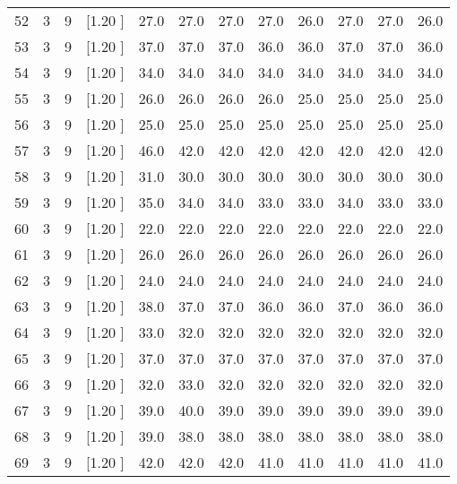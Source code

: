 \documentclass[12pt,a4paper]{article}
\begin{document}
\begin{center}
{\begin{tabular}{r r r r r r r r r r r r}
  52&  3&  9&[1.20      ]&    27.0&    27.0&    27.0&    27.0&    26.0&    27.0&    27.0&    26.0\\[-0.02in]
  53&  3&  9&[1.20      ]&    37.0&    37.0&    37.0&    36.0&    36.0&    37.0&    37.0&    36.0\\[-0.02in]
  54&  3&  9&[1.20      ]&    34.0&    34.0&    34.0&    34.0&    34.0&    34.0&    34.0&    34.0\\[-0.02in]
  55&  3&  9&[1.20      ]&    26.0&    26.0&    26.0&    26.0&    25.0&    25.0&    25.0&    25.0\\[-0.02in]
  56&  3&  9&[1.20      ]&    25.0&    25.0&    25.0&    25.0&    25.0&    25.0&    25.0&    25.0\\[-0.02in]
  57&  3&  9&[1.20      ]&    46.0&    42.0&    42.0&    42.0&    42.0&    42.0&    42.0&    42.0\\[-0.02in]
  58&  3&  9&[1.20      ]&    31.0&    30.0&    30.0&    30.0&    30.0&    30.0&    30.0&    30.0\\[-0.02in]
  59&  3&  9&[1.20      ]&    35.0&    34.0&    34.0&    33.0&    33.0&    34.0&    33.0&    33.0\\[-0.02in]
  60&  3&  9&[1.20      ]&    22.0&    22.0&    22.0&    22.0&    22.0&    22.0&    22.0&    22.0\\[-0.02in]
  61&  3&  9&[1.20      ]&    26.0&    26.0&    26.0&    26.0&    26.0&    26.0&    26.0&    26.0\\[-0.02in]
  62&  3&  9&[1.20      ]&    24.0&    24.0&    24.0&    24.0&    24.0&    24.0&    24.0&    24.0\\[-0.02in]
  63&  3&  9&[1.20      ]&    38.0&    37.0&    37.0&    36.0&    36.0&    37.0&    36.0&    36.0\\[-0.02in]
  64&  3&  9&[1.20      ]&    33.0&    32.0&    32.0&    32.0&    32.0&    32.0&    32.0&    32.0\\[-0.02in]
  65&  3&  9&[1.20      ]&    37.0&    37.0&    37.0&    37.0&    37.0&    37.0&    37.0&    37.0\\[-0.02in]
  66&  3&  9&[1.20      ]&    32.0&    33.0&    32.0&    32.0&    32.0&    32.0&    32.0&    32.0\\[-0.02in]
  67&  3&  9&[1.20      ]&    39.0&    40.0&    39.0&    39.0&    39.0&    39.0&    39.0&    39.0\\[-0.02in]
  68&  3&  9&[1.20      ]&    39.0&    38.0&    38.0&    38.0&    38.0&    38.0&    38.0&    38.0\\[-0.02in]
  69&  3&  9&[1.20      ]&    42.0&    42.0&    42.0&    41.0&    41.0&    41.0&    41.0&    41.0\\[-0.02in]

\end{tabular}}
\end{center}
\end{document}
